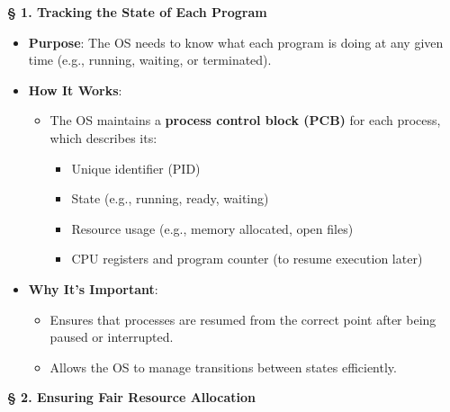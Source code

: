 \documentclass[a4paper]{book}
\newcommand{\sfbf}[1]{{\normalsize\textsf{\textbf{§ #1}}}}
\begin{document}
\sfbf{1. Tracking the State of Each Program}

\begin{itemize}
\item 
\textbf{Purpose}: The OS needs to know what each program is doing at any given time (e.g., running, waiting, or terminated).

\item 
\textbf{How It Works}:
\begin{itemize}
\item 
The OS maintains a \textbf{process control block (PCB)} for each process, which describes its:
\begin{itemize}
\item 
Unique identifier (PID)

\item 
State (e.g., running, ready, waiting)

\item 
Resource usage (e.g., memory allocated, open files)

\item 
CPU registers and program counter (to resume execution later)

\end{itemize}

\end{itemize}

\item 
\textbf{Why It's Important}:
\begin{itemize}
\item 
Ensures that processes are resumed from the correct point after being paused or interrupted.

\item 
Allows the OS to manage transitions between states efficiently.

\end{itemize}

\end{itemize}
\hrulefill

\sfbf{2. Ensuring Fair Resource Allocation}
\end{document}
